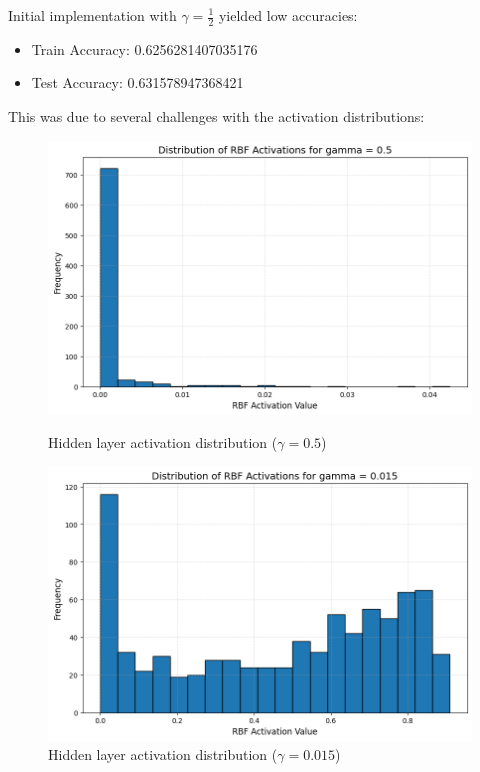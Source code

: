 \documentclass[11pt]{article}
\begin{document}
Initial implementation with $\gamma=\frac{1}{2}$ yielded low accuracies:
\begin{itemize}
    \item Train Accuracy: 0.6256281407035176
    \item Test Accuracy: 0.631578947368421
\end{itemize}
This was due to several challenges with the activation distributions:

\begin{figure}[H]
    \centering
    \begin{minipage}{0.48\textwidth}
        \includegraphics[width=\linewidth]{img/RBF_Activation_500.png}
        \caption{Hidden layer activation distribution ($\gamma=0.5$)}
    \end{minipage}
    \hfill
    \begin{minipage}{0.48\textwidth}
        \includegraphics[width=\linewidth]{img/RBF_Activation_15.png}
        \caption{Hidden layer activation distribution ($\gamma=0.015$)}
    \end{minipage}
\end{figure}
\end{document}
